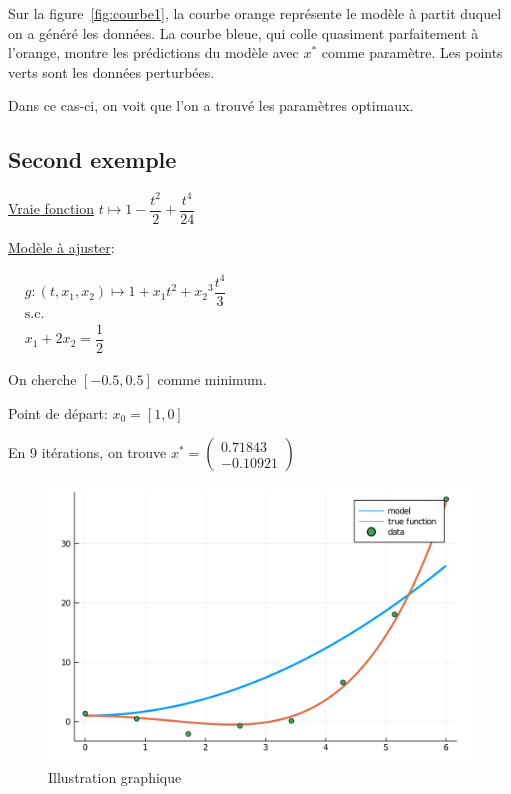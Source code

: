 \documentclass[a4paper,11pt]{article}
\numberwithin{equation}{section}
\begin{document}
Sur la figure~\ref{fig:courbe1}, la courbe orange représente le modèle à partit duquel on a généré les données. La courbe bleue, qui colle quasiment parfaitement à l'orange, montre les prédictions du modèle avec $x^{*}$ comme paramètre. Les points verts sont les données perturbées. 

Dans ce cas-ci, on voit que l'on a trouvé les paramètres optimaux.
\newpage
\subsection{Second exemple}

\underline{Vraie fonction} $t\mapsto 1 - \dfrac{t^2}{2} + \dfrac{t^4}{24}$
\newline

\underline{Modèle à ajuster}:

$
\begin{aligned}
&g:(t, x_1, x_2) \mapsto 1 + x_1t^2 + {x_2}^3\dfrac{t^4}{3}\\
&\text{s.c.}\\
&x_1 + 2x_2 = \dfrac{1}{2}
\end{aligned}
$

On cherche $[-0.5,0.5]$ comme minimum.


Point de départ:
$x_{0} = [1, 0]$

En 9 itérations, on trouve 
 $x^{*} = \begin{pmatrix}
0.71843\\
-0.10921
\end{pmatrix}$

\begin{figure}
\centering
\includegraphics[scale=0.6]{images/courbe2}
\caption{Illustration graphique}
\label{fig:courbe2}
\end{figure}
\end{document}
